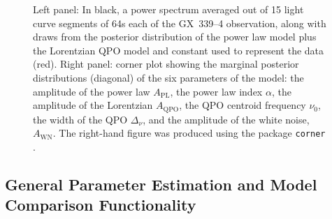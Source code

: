 \documentclass[twocolumn]{aastex62}
\begin{document}
\begin{figure}[htbp]
\begin{center}
\caption{Left panel: In black, a power spectrum averaged out of 15 light curve segments of 64s each of the GX~339--4 observation, along with draws from the posterior distribution of the power law model plus the Lorentzian QPO model and constant used to represent the data (red). 
Right panel: corner plot showing the marginal posterior distributions (diagonal) of the six parameters of the model: the amplitude of the power law $A_\mathrm{PL}$, the power law index $\alpha$, the amplitude of the Lorentzian $A_\mathrm{QPO}$, the QPO centroid frequency $\nu_0$, the width of the QPO $\Delta_\nu$, and the amplitude of the white noise, $A_\mathrm{WN}$. The right-hand figure was produced using the package \texttt{corner} \citep{corner}.}
\label{fig:posterior}
\end{center}
\end{figure}

\subsection{General Parameter Estimation and Model Comparison Functionality}
\end{document}
